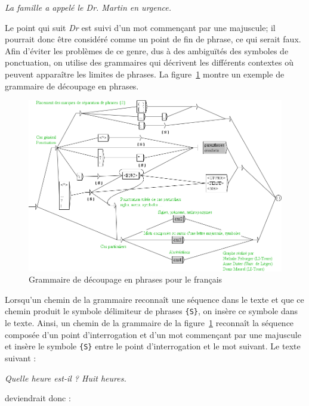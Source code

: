 \bigskip
\textit{La famille a appelé le Dr. Martin en urgence.}

\bigskip \noindent Le point qui suit \textit{Dr} est suivi d’un mot commençant par une majuscule;
il pourrait donc être considéré comme un point de fin de phrase, ce qui serait faux. Afin d’éviter
les problèmes de ce genre, dus à des ambiguïtés des symboles de ponctuation, on utilise des
grammaires qui décrivent les différents contextes où peuvent apparaître les limites de phrases.
La figure~\ref{fig-example-sentence-splitting} montre un exemple de grammaire de découpage en
phrases.

\begin{figure}[!ht]
\begin{center}
\includegraphics[width=15cm]{resources/img/fig2-10-Sentence.png}
\caption{Grammaire de découpage en phrases pour le français
\label{fig-example-sentence-splitting}}
\end{center}
\end{figure}

\noindent  Lorsqu’un chemin de la grammaire reconnaît une séquence dans le texte et que ce chemin
produit le symbole délimiteur de phrases \verb+{S}+,
on insère ce symbole dans le texte. Ainsi,
un chemin de la grammaire de la figure~\ref{fig-example-sentence-splitting} reconnaît la séquence
composée d’un point d’interrogation et d’un mot commençant par une majuscule et insère le symbole 
\verb+{S}+ entre le point d’interrogation et le mot suivant. Le texte suivant :


\bigskip
\textit{Quelle heure est-il ? Huit heures.}

\bigskip
\noindent deviendrait donc :

